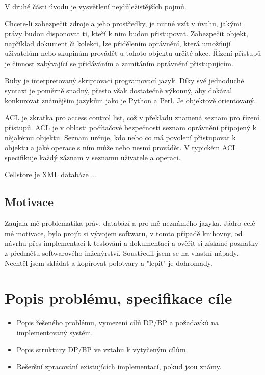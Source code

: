 \documentclass[11pt,twoside,a4paper]{book}
\begin{document}
V druhé části úvodu je vysvětlení nejdůležistějších pojmů.

Chcete-li zabezpečit zdroje a jeho prostředky, je nutné vzít v úvahu, jakými právy budou disponovat ti, kteří k nim budou přistupovat. Zabezpečit objekt, například dokument či kolekci, lze přidělením oprávnění, která umožňují uživatelům nebo skupinám provádět u tohoto objektu určité akce. Řízení přístupů je činnost zabývající se přidáváním a zamítáním oprávnění přistupujícím.

Ruby je interpretovaný skriptovací programovací jazyk. Díky své jednoduché syntaxi je poměrně snadný, přesto však dostatečně výkonný, aby dokázal konkurovat známějším jazykům jako je Python a Perl. Je objektově orientovaný.

ACL je zkratka pro access control list, což v překladu znamená seznam pro řízení přístupů. ACL je v oblasti počítačové bezpečnosti seznam oprávnění připojený k nějakému objektu. Seznam určuje, kdo nebo co má povolení přistupovat k objektu a jaké operace s ním může nebo nesmí provádět. V typickém ACL specifikuje každý záznam v seznamu uživatele a operaci.

Cellstore je XML databáze ...

\section{Motivace}
Zaujala mě problematika práv, databází a pro mě neznámého jazyka.
Jádro celé mé motivace, bylo projít si vývojem softwaru, v tomto případě knihovny, od návrhu přes implementaci k testování a dokumentaci a ověřit si získané poznatky z předmětu softwarového inženýrství. Soustředil jsem se na vlastní nápady. Nechtěl jsem skládat a kopírovat polotvary a "lepit" je dohromady.


\chapter{Popis problému, specifikace cíle}

\begin{itemize}
\item Popis řešeného problému, vymezení cílů DP/BP a požadavků na implementovaný systém.
\item Popis struktury DP/BP ve vztahu k vytyčeným cílům.
\item Rešeršní zpracování existujících implementací, pokud jsou známy.
\end{itemize}
\end{document}
